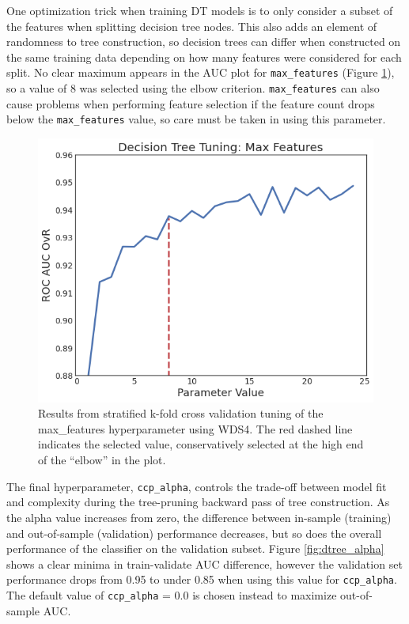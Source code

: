 One optimization trick when training DT models is to only consider a subset of the features when splitting decision tree nodes. This also adds an element of randomness to tree construction, so decision trees can differ when constructed on the same training data depending on how many features were considered for each split. No clear maximum appears in the AUC plot for \verb|max_features| (Figure \ref{fig:dtree_max_features}), so a value of 8 was selected using the elbow criterion. \verb|max_features| can also cause problems when performing feature selection if the feature count drops below the \verb|max_features| value, so care must be taken in using this parameter.

\begin{figure}[!htp]
\centering
\includegraphics[width=.6\textwidth]{templates/images/Figure-DT_tuning_max_features.png}
\caption[Decision tree max features tuning]{Results from stratified k-fold cross validation tuning of the max\_features hyperparameter using WDS4. The red dashed line indicates the selected value, conservatively selected at the high end of the ``elbow'' in the plot.}
\label{fig:dtree_max_features}
\end{figure}

The final hyperparameter, \verb|ccp_alpha|, controls the trade-off between model fit and complexity during the tree-pruning backward pass of tree construction. As the alpha value increases from zero, the difference between in-sample (training) and out-of-sample (validation) performance decreases, but so does the overall performance of the classifier on the validation subset. Figure \ref{fig:dtree_alpha} shows a clear minima in train-validate AUC difference, however the validation set performance drops from 0.95 to under 0.85 when using this value for \verb|ccp_alpha|. The default value of \verb|ccp_alpha| = 0.0 is chosen instead to maximize out-of-sample AUC.

